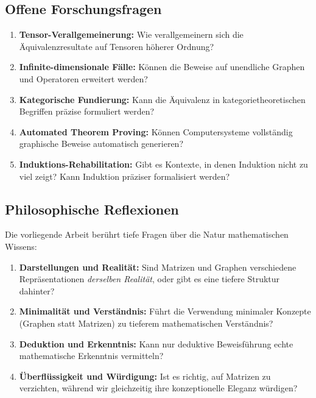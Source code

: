 \documentclass[12pt, a4paper]{article}
\theoremstyle{definition}
\theoremstyle{remark}
\begin{document}
\subsection{Offene Forschungsfragen}
\label{subsec:offene_fragen}

\begin{enumerate}[label=(\roman*)]
  \item \textbf{Tensor-Verallgemeinerung:} Wie verallgemeinern sich die Äquivalenzresultate auf Tensoren höherer Ordnung?
  
  \item \textbf{Infinite-dimensionale Fälle:} Können die Beweise auf unendliche Graphen und Operatoren erweitert werden?
  
  \item \textbf{Kategorische Fundierung:} Kann die Äquivalenz in kategorietheoretischen Begriffen präzise formuliert werden?
  
  \item \textbf{Automated Theorem Proving:} Können Computersysteme vollständig graphische Beweise automatisch generieren?
  
  \item \textbf{Induktions-Rehabilitation:} Gibt es Kontexte, in denen Induktion nicht zu viel zeigt? Kann Induktion präziser formalisiert werden?
\end{enumerate}

\subsection{Philosophische Reflexionen}
\label{subsec:philosophie}

Die vorliegende Arbeit berührt tiefe Fragen über die Natur mathematischen Wissens:

\begin{enumerate}[label=(\alph*)]
  \item \textbf{Darstellungen und Realität:} Sind Matrizen und Graphen verschiedene Repräsentationen \emph{derselben Realität}, oder gibt es eine tiefere Struktur dahinter?
  
  \item \textbf{Minimalität und Verständnis:} Führt die Verwendung minimaler Konzepte (Graphen statt Matrizen) zu tieferem mathematischen Verständnis?
  
  \item \textbf{Deduktion und Erkenntnis:} Kann nur deduktive Beweisführung echte mathematische Erkenntnis vermitteln?
  
  \item \textbf{Überflüssigkeit und Würdigung:} Ist es richtig, auf Matrizen zu verzichten, während wir gleichzeitig ihre konzeptionelle Eleganz würdigen?
\end{enumerate}
\end{document}
